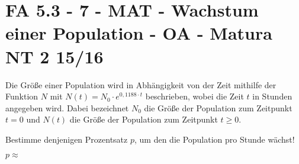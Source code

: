 \section{FA 5.3 - 7 - MAT - Wachstum einer Population - OA - Matura NT 2 15/16}

\begin{beispiel}[FA 5.3]{1} %
Die Größe einer Population wird in Abhängigkeit von der Zeit mithilfe der Funktion $N$ mit $N(t)=N_0\cdot e^{0,1188\cdot t}$ beschrieben, wobei die Zeit $t$ in Stunden angegeben wird. Dabei bezeichnet $N_0$ die Größe der Population zum Zeitpunkt $t=0$ und $N(t)$ die Größe der Population zum Zeitpunkt $t\geq 0$.

Bestimme denjenigen Prozentsatz $p$, um den die Population pro Stunde wächst!\leer

$p\approx$ 
\end{beispiel}